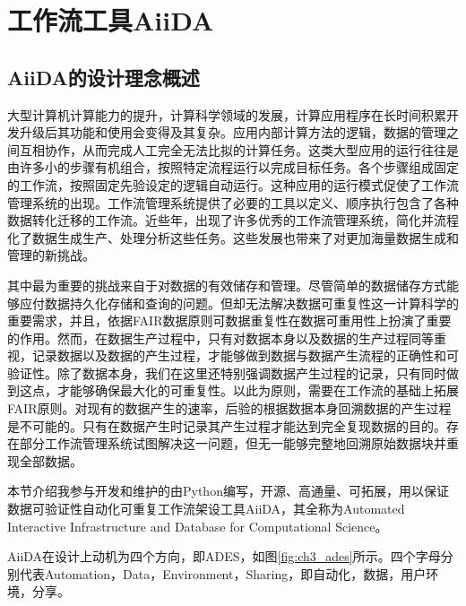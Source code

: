 \section{工作流工具AiiDA}

\subsection{AiiDA的设计理念概述}

大型计算机计算能力的提升，计算科学领域的发展，计算应用程序在长时间积累开发升级后其功能和使用会变得及其复杂。应用内部计算方法的逻辑，数据的管理之间互相协作，从而完成人工完全无法比拟的计算任务。这类大型应用的运行往往是由许多小的步骤有机组合，按照特定流程运行以完成目标任务。各个步骤组成固定的工作流，按照固定先验设定的逻辑自动运行。这种应用的运行模式促使了工作流管理系统的出现。工作流管理系统提供了必要的工具以定义、顺序执行包含了各种数据转化迁移的工作流。近些年，出现了许多优秀的工作流管理系统，简化并流程化了数据生成生产、处理分析这些任务。这些发展也带来了对更加海量数据生成和管理的新挑战。

其中最为重要的挑战来自于对数据的有效储存和管理。尽管简单的数据储存方式能够应付数据持久化存储和查询的问题。但却无法解决数据可重复性这一计算科学的重要需求，并且，依据FAIR数据原则\cite{wilkinson2016fair}可数据重复性在数据可重用性上扮演了重要的作用。然而，在数据生产过程中，只有对数据本身以及数据的生产过程同等重视，记录数据以及数据的产生过程，才能够做到数据与数据产生流程的正确性和可验证性\cite{ioannidis2009repeatability,peng2011reproducible,stoddart2016there,allison2016reproducibility}。除了数据本身，我们在这里还特别强调数据产生过程的记录，只有同时做到这点，才能够确保最大化的可重复性。以此为原则，需要在工作流的基础上拓展FAIR原则。对现有的数据产生的速率，后验的根据数据本身回溯数据的产生过程是不可能的。只有在数据产生时记录其产生过程才能达到完全复现数据的目的。存在部分工作流管理系统试图解决这一问题，但无一能够完整地回溯原始数据块并重现全部数据。

本节介绍我参与开发和维护的由Python编写，开源、高通量、可拓展，用以保证数据可验证性自动化可重复工作流架设工具AiiDA\cite{pizzi2016aiida,huber2020aiida}，其全称为Automated Interactive Infrastructure and Database for Computational Science。

AiiDA在设计上动机为四个方向，即ADES，如图\ref{fig:ch3_ades}所示。四个字母分别代表Automation，Data，Environment，Sharing，即自动化，数据，用户环境，分享。

